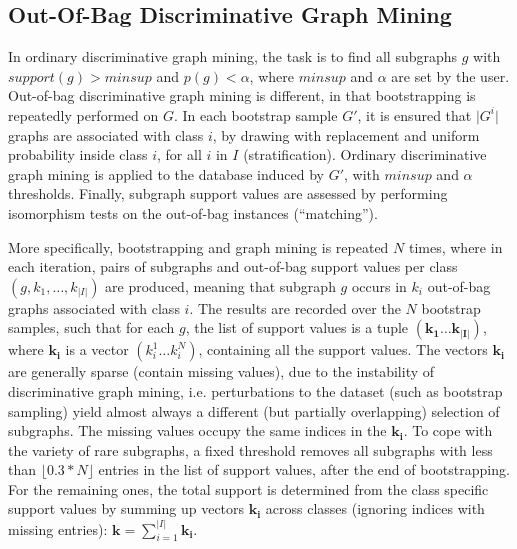 \documentclass{sig-alternate}
\begin{document}
\subsection{Out-Of-Bag Discriminative Graph Mining}
\label{ss:oob-dgm}
In ordinary discriminative graph mining, the task is to find all subgraphs
$g$ with $support(g)>minsup$ and $p(g)<\alpha$, where $minsup$ and $\alpha$ are
set by the user.
Out-of-bag discriminative graph mining is different, in that bootstrapping is repeatedly performed on $G$.
In each bootstrap sample $G'$, it is ensured that $\vert G^i\vert$ graphs are associated with
class $i$, by drawing with replacement and uniform probability inside 
class $i$, for all $i$ in $I$ (stratification). 
Ordinary discriminative graph mining is applied to the database induced by $G'$, with $minsup$ and $\alpha$ thresholds. 
Finally, subgraph support values are assessed by performing isomorphism
tests on the out-of-bag instances (``matching'').

More specifically, bootstrapping and graph mining is repeated $N$ times, where in each
iteration, pairs of subgraphs and out-of-bag support values per class
$(g,k_1,\ldots,k_{\vert I\vert})$ are produced, meaning that subgraph $g$
occurs in $k_i$ out-of-bag graphs associated with class $i$. The results are
recorded over the $N$ bootstrap samples, such that for each $g$, the list of
support values is a tuple $(\mathbf{k_1}\ldots\mathbf{k_{\vert I\vert}})$,
where $\mathbf{k_i}$ is a vector $(k_i^1\ldots k_i^N)$, containing all the
support values. 
The vectors $\mathbf{k_i}$
are generally sparse (contain missing values), due to the instability of discriminative graph mining,
i.e. perturbations to the dataset (such as bootstrap sampling) yield almost
always a different (but partially overlapping) selection of subgraphs. 
The missing values occupy the same indices in the $\mathbf{k_i}$.
To cope with the
variety of rare subgraphs, a fixed threshold removes all subgraphs with less
than $\lfloor0.3*N\rfloor$ entries in the list of support values, after the end
of bootstrapping.
For the remaining ones, the total support is determined from the class specific support values by
summing up vectors $\mathbf{k_i}$ across classes (ignoring indices with missing entries):
$\mathbf{k}=\sum_{i=1}^{\vert I\vert} \mathbf{k_i}$. 
\end{document}
